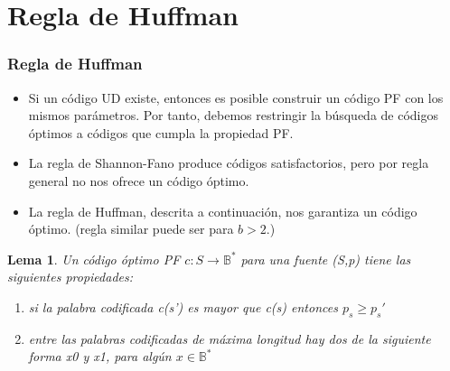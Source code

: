 \documentclass{beamer}
\newtheorem{lema} [theorem] {Lema}
\begin{document}
\section{Regla de Huffman}
\begin{frame}  \frametitle{Regla de Huffman}\footnotesize 

\begin{itemize}
\item Si un código UD existe, entonces es posible construir un código PF con los mismos parámetros. Por tanto, debemos restringir la búsqueda de códigos óptimos a códigos que cumpla la propiedad PF.

\item La regla de Shannon-Fano produce códigos satisfactorios, pero por regla general no nos ofrece un código óptimo.

\item  La regla de Huffman, descrita a continuación, nos garantiza un código óptimo. (regla similar puede ser para $b > 2$.)
 \end{itemize}

\begin{lema}
Un código óptimo PF $c: S\rightarrow \mathbb{B}^{*}$ para una fuente (S,p) tiene las siguientes propiedades:
\begin{enumerate}
\item si la palabra codificada c(s') es mayor que c(s) entonces $p_s \geq p_s'$
\item entre las palabras codificadas de máxima longitud hay dos de la siguiente forma x0 y x1, para algún $x  \in \mathbb{B}^{*}$
\end{enumerate}
\end{lema}


\end{frame} 
\end{document}

